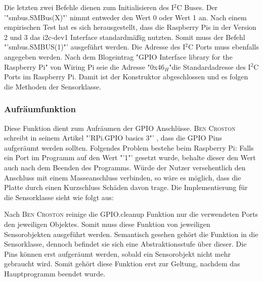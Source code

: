 	Die letzten zwei Befehle dienen zum Initialisieren des I$^2$C Buses. Der '"smbus.SMBus(X)"' nimmt entweder den Wert 0 oder Wert 1 an. Nach einem empirischen Test hat es sich herausgestellt, dass die Raspberry Pis in der Version 2 und 3 das i2c-dev1 Interface standardmäßig nutzten. Somit muss der Befehl "'smbus.SMBUS(1)"' ausgeführt werden. Die Adresse des I$^2$C Ports muss ebenfalls angegeben werden. Nach dem Blogeintrag "GPIO Interface library for the Raspberry Pi"\cite{I2CPCF8592:online} von Wiring Pi seie die Adresse "0x46$_H$"\space die Standardadresse des I$^2$C Ports im Raspberry Pi. Damit ist der Konstruktor abgeschlossen und es folgen die Methoden der Sensorklasse.
	
\subsubsection*{Aufräumfunktion}
	Diese Funktion dient zum Aufräumen der \ac{GPIO} Anschlüsse. \textsc{Ben Croston} schreibt in seinem Artikel "'RPi.GPIO basics 3"' \cite{RPiGPIOb90:online}, dass die \ac{GPIO} Pins aufgeräumt werden sollten. Folgendes Problem bestehe beim Raspberry Pi: Falls ein Port im Programm auf den Wert "'1"' gesetzt wurde, behalte dieser den Wert auch nach dem Beenden des Programms. Würde der Nutzer versehentlich den Anschluss mit einem Masseanschluss verbinden, so wäre es möglich, dass die Platte durch einen Kurzschluss Schäden davon trage. Die Implementierung für die Sensorklasse sieht wie folgt aus:
	
	Nach \textsc{Ben Croston} \cite{RPiGPIOb90:online} reinige die GPIO.cleanup Funktion nur die verwendeten Ports den jeweiligen Objektes. Somit muss diese Funktion von jeweiligen Sensorobjekten ausgeführt werden. Semantisch gesehen gehört die Funktion in die Sensorklasse, dennoch befindet sie sich eine Abstraktionsstufe über dieser. Die Pins können erst aufgeräumt werden, sobald ein Sensorobjekt nicht mehr gebraucht wird. Somit gehört diese Funktion erst zur Geltung, nachdem das Hauptprogramm	beendet wurde.
